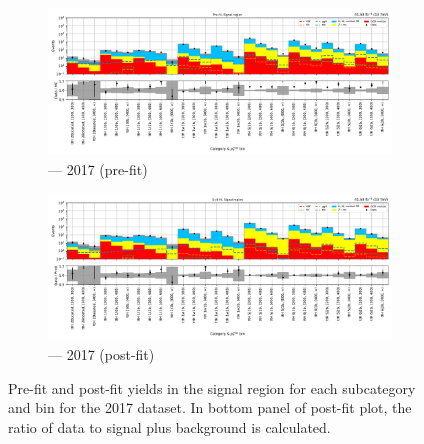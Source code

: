 \begin{figure}[htbp]
    \centering
    \begin{subfigure}[b]{0.9\textwidth}
        \includegraphics[width=\textwidth]{figures/mountain_ranges/2017/ttH/SR_tree_prefit-abs_values_ttH_cats.pdf}
        \caption{\ttH --- 2017 (pre-fit)}
    \end{subfigure}

    \begin{subfigure}[b]{0.9\textwidth}
        \includegraphics[width=\textwidth]{figures/mountain_ranges/2017/ttH/SR_tree_fit_s-abs_values_ttH_cats.pdf}
        \caption{\ttH --- 2017 (post-fit)}
    \end{subfigure}
    \caption[Pre-fit and post-fit yields in the signal region for each \ttH subcategory and \ptmiss bin for the 2017 dataset]{Pre-fit and post-fit yields in the signal region for each \ttH subcategory and \ptmiss bin for the 2017 dataset. In bottom panel of post-fit plot, the ratio of data to signal plus background is calculated.}
    \label{fig:htoinv_mountain_range_ttH_2017}
\end{figure}

